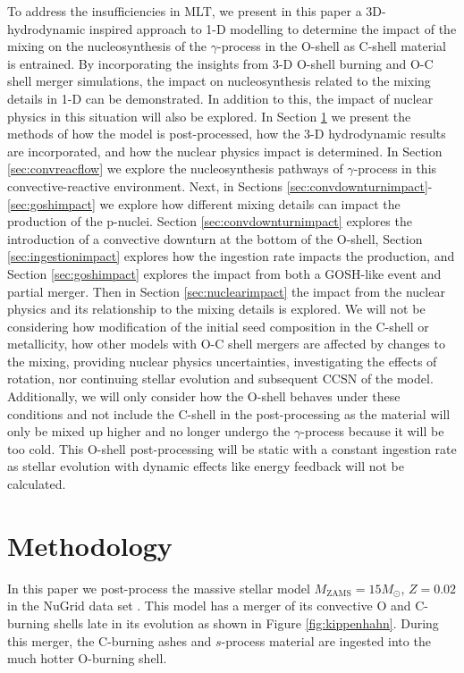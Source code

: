 To address the insufficiencies in MLT, we present in this paper a 3D-hydrodynamic inspired approach to 1-D modelling to determine the impact of the mixing on the nucleosynthesis of the $\gamma$-process in the O-shell as C-shell material is entrained. 
By incorporating the insights from 3-D O-shell burning and O-C shell merger simulations, the impact on nucleosynthesis related to the mixing details in 1-D can be demonstrated. 
In addition to this, the impact of nuclear physics in this situation will also be explored.
In Section \ref{sec:methods} we present the methods of how the \cite{ritterNuGridStellarData2018} model is post-processed, how the 3-D hydrodynamic results are incorporated, and how the nuclear physics impact is determined. 
In Section \ref{sec:convreacflow} we explore the nucleosynthesis pathways of $\gamma$-process in this convective-reactive environment. 
Next, in Sections \ref{sec:convdownturnimpact}-\ref{sec:goshimpact} we explore how different mixing details can impact the production of the p-nuclei. 
Section \ref{sec:convdownturnimpact} explores the introduction of a convective downturn at the bottom of the O-shell, Section \ref{sec:ingestionimpact} explores how the ingestion rate impacts the production, and Section \ref{sec:goshimpact} explores the impact from both a GOSH-like event and partial merger.
Then in Section \ref{sec:nuclearimpact} the impact from the nuclear physics and its relationship to the mixing details is explored. 
We will not be considering how modification of the initial seed composition in the C-shell or metallicity, how other models with O-C shell mergers are affected by changes to the mixing, providing nuclear physics uncertainties, investigating the effects of rotation, nor continuing stellar evolution and subsequent CCSN of the model.
Additionally, we will only consider how the O-shell behaves under these conditions and not include the C-shell in the post-processing as the material will only be mixed up higher and no longer undergo the $\gamma$-process because it will be too cold.
This O-shell post-processing will be static with a constant ingestion rate as stellar evolution with dynamic effects like energy feedback will not be calculated.
  
\section{Methodology} \label{sec:methods}

In this paper we post-process the massive stellar model $M_{\mathrm{ZAMS}}=15 M_\odot$,  $Z=0.02$ in the NuGrid data set \citep{ritterNuGridStellarData2018}.
This model has a merger of its convective O and C-burning shells late in its evolution as shown in Figure \ref{fig:kippenhahn}.
During this merger, the C-burning ashes and $s$-process material are ingested into the much hotter O-burning shell.

